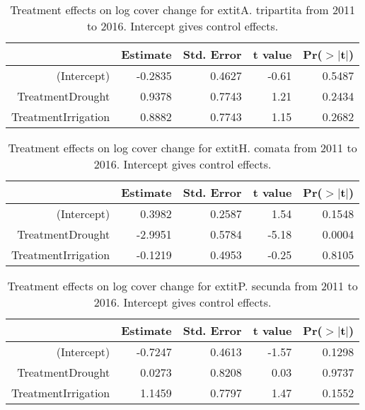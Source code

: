 \documentclass[11pt]{article}
\begin{document}
\begin{table}[ht]
	\centering
	\begin{tabular}{rrrrr}
		\hline
		& Estimate & Std. Error & t value & Pr($>$$|$t$|$) \\ 
		\hline
		(Intercept) & -0.2835 & 0.4627 & -0.61 & 0.5487 \\ 
		TreatmentDrought & 0.9378 & 0.7743 & 1.21 & 0.2434 \\ 
		TreatmentIrrigation & 0.8882 & 0.7743 & 1.15 & 0.2682 \\ 
		\hline
	\end{tabular}
	\caption{Treatment effects on log cover change for 	extit{A. tripartita} from 2011 to 2016. Intercept gives control effects.} 
	\label{table:changeARTR}
\end{table}

\begin{table}[ht]
	\centering
	\begin{tabular}{rrrrr}
		\hline
		& Estimate & Std. Error & t value & Pr($>$$|$t$|$) \\ 
		\hline
		(Intercept) & 0.3982 & 0.2587 & 1.54 & 0.1548 \\ 
		TreatmentDrought & -2.9951 & 0.5784 & -5.18 & 0.0004 \\ 
		TreatmentIrrigation & -0.1219 & 0.4953 & -0.25 & 0.8105 \\ 
		\hline
	\end{tabular}
	\caption{Treatment effects on log cover change for 	extit{H. comata} from 2011 to 2016. Intercept gives control effects.} 
	\label{table:changeHECO}
\end{table}

\begin{table}[ht]
	\centering
	\begin{tabular}{rrrrr}
		\hline
		& Estimate & Std. Error & t value & Pr($>$$|$t$|$) \\ 
		\hline
		(Intercept) & -0.7247 & 0.4613 & -1.57 & 0.1298 \\ 
		TreatmentDrought & 0.0273 & 0.8208 & 0.03 & 0.9737 \\ 
		TreatmentIrrigation & 1.1459 & 0.7797 & 1.47 & 0.1552 \\ 
		\hline
	\end{tabular}
	\caption{Treatment effects on log cover change for 	extit{P. secunda} from 2011 to 2016. Intercept gives control effects.} 
	\label{table:changePOSE}
\end{table}
\end{document}
